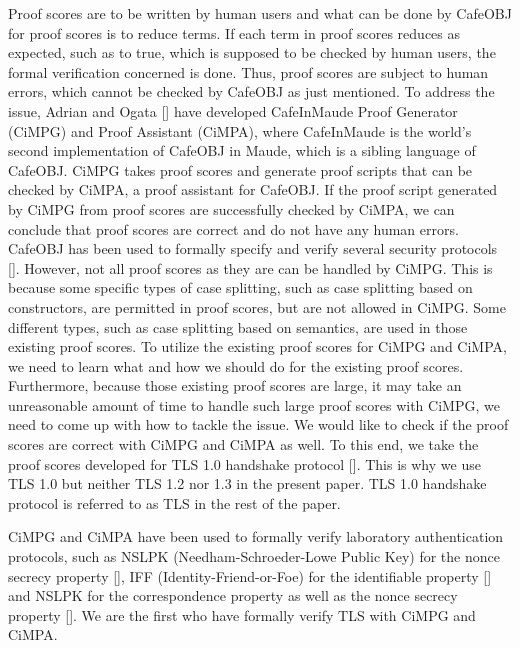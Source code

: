 \documentclass[a4paper,fleqn]{cas-dc}
\begin{document}
Proof scores are to be written by human users and what can be done by CafeOBJ for proof scores is to reduce terms. If each term in proof scores reduces as expected, such as to true, which is supposed to be checked by human users, the formal verification concerned is done. Thus, proof scores are subject to human errors, which cannot be checked by CafeOBJ as just mentioned. To address the issue, Adrian and Ogata [\citep{RiescoO18tosem}] have developed CafeInMaude Proof Generator (CiMPG) and Proof Assistant (CiMPA), where CafeInMaude is the world's second implementation of CafeOBJ in Maude, which is a sibling language of CafeOBJ. CiMPG takes proof scores and generate proof scripts that can be checked by CiMPA, a proof assistant for CafeOBJ. If the proof script generated by CiMPG from proof scores are successfully checked by CiMPA, we can conclude that proof scores are correct and do not have any human errors. CafeOBJ has been used to formally specify and verify several security protocols [\citep{10.5555/1765533.1765569, 10.5555/646542.696196, 1357944, 1437139}]. However, not all proof scores as they are can be handled by CiMPG. This is because some specific types of case splitting, such as case splitting based on constructors, are permitted in proof scores, but are not allowed in CiMPG. Some different types, such as case splitting based on semantics, are used in those existing proof scores. To utilize the existing proof scores for CiMPG and CiMPA, we need to learn what and how we should do for the existing proof scores. Furthermore, because those existing proof scores are large, it may take an unreasonable amount of time to handle such large proof scores with CiMPG, we need to come up with how to tackle the issue. We would like to check if the proof scores are correct with CiMPG and CiMPA as well. To this end, we take the proof scores developed for TLS 1.0 handshake protocol [\cite{1437139}]. This is why we use TLS 1.0 but neither TLS 1.2 nor 1.3 in the present paper. TLS 1.0 handshake protocol is referred to as TLS in the rest of the paper.

CiMPG and CiMPA have been used to formally verify laboratory authentication protocols, such as NSLPK (Needham-Schroeder-Lowe Public Key) for the nonce secrecy property [\cite{RiescoO18tosem}], IFF (Identity-Friend-or-Foe) for the identifiable property [\cite{twmon}] and NSLPK for the correspondence property as well as the nonce secrecy property [\cite{twmon}]. We are the first who have formally verify TLS with CiMPG and CiMPA.
\end{document}
